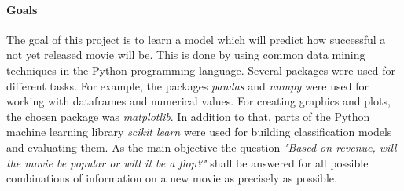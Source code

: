 \paragraph{Goals}
The goal of this project is to learn a model which will predict how successful a not yet released movie will be. This is done by using common data mining techniques in the Python programming language. Several packages were used for different tasks. For example, the packages \textit{pandas} and \textit{numpy} were used for working with dataframes and numerical values. For creating graphics and plots, the chosen package was \textit{matplotlib}. In addition to that, parts of the  Python machine learning library \textit{scikit learn} were used for building classification models and evaluating them. As the main objective the question \textit{"Based on revenue, will the movie be popular or will it be a flop?"} shall be answered for all possible combinations of information on a new movie as precisely as possible.








 